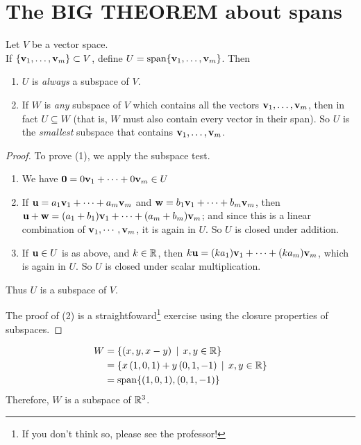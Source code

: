 
\section{The BIG THEOREM about spans}

\begin{theorem}\label{span} 
Let $V$ be a vector space. \hfill \\ If $\{ \mathbf{v}_1, \ldots, \mathbf{v}_m\} \subset V$, define $U = \textrm{span}\{ \mathbf{v}_1, \ldots, \mathbf{v}_m\} $.
Then \begin{enumerate}
\item $U  $ is \emph{always} a subspace 
of $V$.
\item If $W$ is \emph{any} subspace of $V$ which contains all the
vectors $\mathbf{v}_1, \ldots, \mathbf{v}_m$, then in fact $U \subseteq W$ (that is,
$W$ must also contain every vector in their span).  So $U$ is 
the \emph{smallest} subspace that contains $\mathbf{v}_1, \ldots, \mathbf{v}_m$.
\end{enumerate}
\end{theorem}

\begin{proof}
To prove (1), we apply the subspace test.
\begin{enumerate}
\item We have $\mathbf{0} = 0 \mathbf{v}_1 + \cdots + 0\mathbf{v}_m \in U$
\item If $\mathbf{u} = a_1\mathbf{v}_1 + \cdots + a_m\mathbf{v}_m$ and $\mathbf{w} = b_1\mathbf{v}_1 + \cdots + b_m\mathbf{v}_m$, then $\mathbf{u} + \mathbf{w} = (a_1+b_1)\mathbf{v}_1 + \cdots + (a_m+b_m)\mathbf{v}_m$; and since
this is a linear combination of $\mathbf{v}_1, \cdots, \mathbf{v}_m$, it is again in $U$.
So $U$ is closed under addition.
\item If $\mathbf{u} \in U$ is as above, and $k \in \mathbb{R}$, then 
$k\mathbf{u} = (ka_1)\mathbf{v}_1 + \cdots + (ka_m)\mathbf{v}_m$, which is again in $U$.  So
$U$ is closed under scalar multiplication.
\end{enumerate}
Thus $U$ is a subspace of $V$.

The proof of (2) is a straightfoward\footnote{If you don't think so, please see the professor!} exercise using the closure properties of subspaces.
\end{proof}

\begin{myexample} 
\begin{align*}W &= \{(x,y,x-y) \,\mid \, x,y\in \mathbb{R}\}\\ &= \{x\, (1,0,1)+ y\, (0,1,-1)\,\mid \, x,y \in \mathbb{R} \}\\&=\textrm{span}\{ (1,0,1),(0,1,-1)\}
\end{align*}
Therefore, $W$ is a subspace of $\mathbb{R}^3$. \end{myexample}
 
